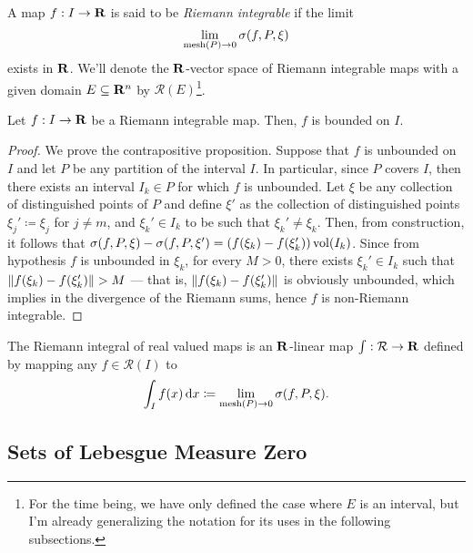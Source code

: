 \begin{definition}
\label{def:riemann-integrable}
A map \(f: I \to \mathbf{R}\) is said to be \emph{Riemann integrable} if the limit
\[
  \lim_{\operatorname{mesh}(P) \to 0} \sigma(f, P, \xi)
\]
exists in \(\mathbf{R}\). We'll denote the \(\mathbf{R}\)-vector space of Riemann integrable
maps with a given domain \(E \subseteq \mathbf{R}^n\) by \(\mathcal R(E)\)\footnote{For
the time being, we have only defined the case where \(E\) is an interval, but
I'm already generalizing the notation for its uses in the following
subsections.}.
\end{definition}

\begin{proposition}
\label{prop:riemann-integral-map-bounded}
Let \(f: I \to \mathbf{R}\) be a Riemann integrable map. Then, \(f\) is bounded on \(I\).
\end{proposition}

\begin{proof}
We prove the contrapositive proposition. Suppose that \(f\) is unbounded on
\(I\) and let \(P\) be any partition of the interval \(I\). In particular, since
\(P\) covers \(I\), then there exists an interval \(I_{k} \in P\) for which
\(f\) is unbounded. Let \(\xi\) be any collection of distinguished points of
\(P\) and define \(\xi'\) as the collection of distinguished points \(\xi_j'
\coloneq \xi_j\) for \(j \neq m\), and \(\xi_k' \in I_k\) to be such that
\(\xi_k' \neq \xi_k\). Then, from construction, it follows that \(\sigma(f, P,
\xi) - \sigma(f, P, \xi') = (f(\xi_k) - f(\xi_k')) \operatorname{vol}(I_k)\). Since from
hypothesis \(f\) is unbounded in \(\xi_k\), for every \(M > 0\), there exists
\(\xi_k' \in I_k\) such that \(\lVert f(\xi_k) - f(\xi_k')\rVert > M\) --- that is,
\(\lVert f(\xi_k) - f(\xi_k')\rVert\) is obviously unbounded, which implies in the
divergence of the Riemann sums, hence \(f\) is non-Riemann integrable.
\end{proof}

\begin{definition}
\label{def:riemann-integral}
The Riemann integral of real valued maps is an \(\mathbf{R}\)-linear map \(\int:
\mathcal R \to \mathbf{R}\) defined by mapping any \(f \in \mathcal R(I)\) to
\[
  \int_I f(x)\, \mathrm{d} x \coloneq \lim_{\operatorname{mesh}(P) \to 0} \sigma(f, P, \xi).
\]
\end{definition}

\subsection{Sets of Lebesgue Measure Zero}

